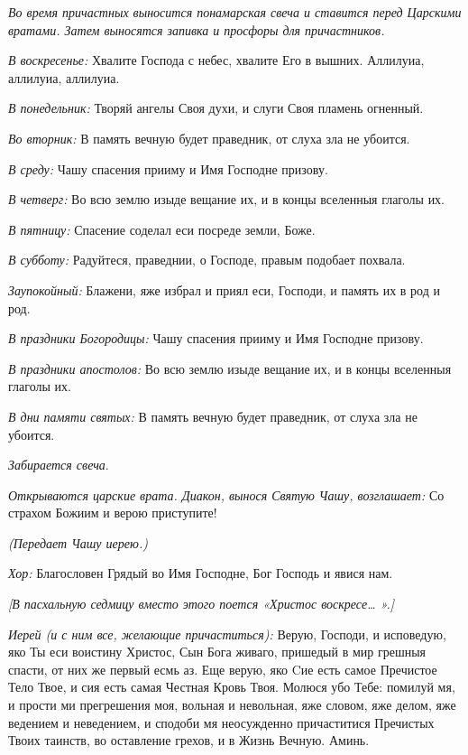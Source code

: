 \begin{mymulticols}
{\itshape Во время причастных выносится понамарская свеча и ставится перед Царскими вратами. Затем выносятся запивка и просфоры для причастников.}

{\itshape В воскресенье:} Хвалите Господа с небес, хвалите Его в вышних. Аллилуиа, аллилуиа, аллилуиа. 

{\itshape В понедельник:} Творяй ангелы Своя духи, и слуги Своя пламень огненный. 

{\itshape Во вторник:} В память вечную будет праведник, от слуха зла не убоится. 

{\itshape В среду:} Чашу спасения прииму и Имя Господне призову. 

{\itshape В четверг:} Во всю землю изыде вещание их, и в концы вселенныя глаголы их. 

{\itshape В пятницу:} Спасение соделал еси посреде земли, Боже. 

{\itshape В субботу:} Радуйтеся, праведнии, о Господе, правым подобает похвала. 

{\itshape Заупокойный:} Блажени, яже избрал и приял еси, Господи, и память их в род и род. 

{\itshape В праздники Богородицы:} Чашу спасения прииму и Имя Господне призову. 

{\itshape В праздники апостолов:} Во всю землю изыде вещание их, и в концы вселенныя глаголы их. 

{\itshape В дни памяти святых:} В память вечную будет праведник, от слуха зла не убоится. 

{\itshape  Забирается свеча}.

{\itshape Открываются царские врата. Диакон, вынося Святую Чашу, возглашает:} Со страхом Божиим и верою приступите! 

{\itshape (Передает Чашу иерею.) }

{\itshape Хор:} Благословен Грядый во Имя Господне, Бог Господь и явися нам.

{\itshape [В пасхальную седмицу вместо этого поется «Христос воскресе… ».]}

{\itshape Иерей (и с ним все, желающие причаститься):} Верую, Господи, и исповедую, яко Ты еси воистину Христос, Сын Бога живаго, пришедый в мир грешныя спасти, от них же первый есмь аз. Еще верую, яко Cие есть самое Пречистое Тело Твое, и сия есть самая Честная Кровь Твоя. Молюся убо Тебе: помилуй мя, и прости ми прегрешения моя, вольная и невольная, яже словом, яже делом, яже ведением и неведением, и сподоби мя неосужденно причаститися Пречистых Твоих таинств, во оставление грехов, и в Жизнь Вечную. Аминь.


\end{mymulticols}
